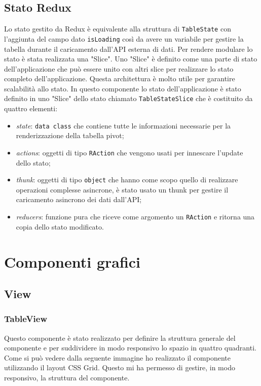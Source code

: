 \subsection{Stato Redux}
Lo stato gestito da Redux è equivalente alla struttura di \verb|TableState| con l'aggiunta del campo dato \verb|isLoading| così da avere un variabile per gestire la tabella durante il caricamento dall'API esterna di dati. Per rendere modulare lo stato è stata realizzata una "Slice". Uno "Slice" è definito come una parte di stato dell'applicazione che può essere unito con altri slice per realizzare lo stato completo dell'applicazione. Questa architettura è molto utile per garantire scalabilità allo stato. In questo componente lo stato dell'applicazione è stato definito in uno "Slice" dello stato chiamato \verb|TableStateSlice| che è costituito da quattro elementi:
\begin{itemize}
	\item \emph{state}: \verb|data class| che contiene tutte le informazioni necessarie per la renderizzazione della tabella pivot;
	\item \emph{actions}: oggetti di tipo \verb|RAction| che vengono usati per innescare l'update dello stato; 
	\item \emph{thunk}: oggetti di tipo \verb|object| che hanno come scopo quello di realizzare operazioni complesse asincrone, è stato usato un thunk per gestire il caricamento asincrono dei dati dall'API;
	\item \emph{reducers}: funzione pura che riceve come argomento un \verb|RAction| e ritorna una copia dello stato modificato.
\end{itemize}


\section{Componenti grafici}
\subsection{View}
\subsubsection{TableView}
Questo componente è stato realizzato per definire la struttura generale del componente e per suddividere in modo responsivo lo spazio in quattro quadranti. Come si può vedere dalla seguente immagine ho realizzato il componente utilizzando il layout CSS Grid. Questo mi ha permesso di gestire, in modo responsivo, la struttura del componente.

